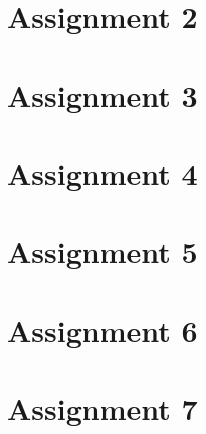 \documentclass[12pt, openright, twoside]{report}
\begin{document}
\section*{Assignment 2}
\section*{Assignment 3}
\section*{Assignment 4}
\section*{Assignment 5}
\section*{Assignment 6}
\section*{Assignment 7}
\end{document}
